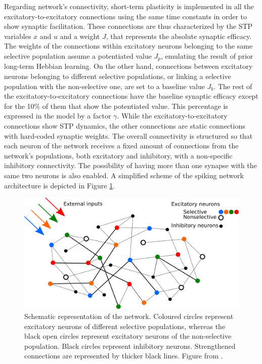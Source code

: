 \documentclass[a4paper, 12pt, twoside, openright]{book}
\begin{document}
Regarding network's connectivity, short-term plasticity is implemented in all the excitatory-to-excitatory connections using the same time constants in order to show synaptic facilitation. These connections are thus characterized by the STP variables $x$ and $u$ and a weight $J$, that represents the absolute synaptic efficacy. The weights of the connections within excitatory neurons belonging to the same selective population assume a potentiated value $J_p$, emulating the result of prior long-term Hebbian learning. On the other hand, connections between excitatory neurons belonging to different selective populations, or linking a selective population with the non-selective one, are set to a baseline value $J_b$. The rest of the excitatory-to-excitatory connections have the baseline synaptic efficacy except for the 10\% of them that show the potentiated value. This percentage is expressed in the model by a factor $\gamma$. While the excitatory-to-excitatory connections show STP dynamics, the other connections are static connections with hard-coded synaptic weights. The overall connectivity is structured so that each neuron of the network receives a fixed amount of connections from the network's populations, both excitatory and inhibitory, with a non-specific inhibitory connectivity. The possibility of having more than one synapse with the same two neurons is also enabled.
A simplified scheme of the spiking network architecture is depicted in Figure \ref{fig:network_arch}. 

\begin{figure}[h]
    \centering
    \includegraphics[width = 0.8\columnwidth]{figures/network_arch.png}
    \caption{Schematic representation of the network. Coloured circles represent excitatory neurons of different selective populations, whereas the black open circles represent excitatory neurons of the non-selective population. Black circles represent inhibitory neurons. Strengthened connections are represented by thicker black lines. Figure from \cite{Tiddia2022_WM}.}
    \label{fig:network_arch}
\end{figure}
\end{document}
